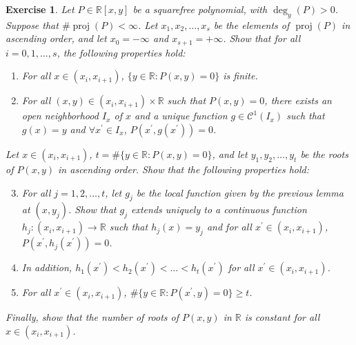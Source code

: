 \documentclass{article}
\newtheorem{exercise}{Exercise}
\begin{document}
\begin{exercise}
    Let $P \in \mathbb{R}[x,y]$ be a squarefree polynomial, with $\deg_{y}(P) > 0$. Suppose that $\#\operatorname{proj}(P)<\infty$. Let $x_{1},x_{2},\dots,x_{s}$ be the elements of $\operatorname{proj}(P)$ in ascending order, and let $x_{0} = -\infty$ and $x_{s+1} = +\infty$. Show that for all $i = 0, 1, \dots, s$, the following properties hold:
    \begin{enumerate}
        \item For all $x\in (x_{i},x_{i+1})$, $\lbrace y \in \mathbb{R} : P(x,y) = 0 \rbrace$ is finite.
        \item For all $(x,y)\in (x_{i},x_{i+1})\times \mathbb{R}$ such that $P(x,y) = 0$, there exists an open neighborhood \(I_{x}\) of \(x\) and a unique function \(g \in \mathcal{C}^{1}(I_{x})\) such that \(g(x) = y\) and \(\forall x^\prime \in I_{x}\), \(P(x^\prime,g(x^\prime))=0\).
    \end{enumerate}

    Let $x\in(x_{i},x_{i+1})$, $t=\#\lbrace y \in \mathbb{R} : P(x,y) = 0 \rbrace$, and let $y_{1},y_{2},\dots,y_{t}$ be the roots of $P(x,y)$ in ascending order. Show that the following properties hold:
    \begin{enumerate}
        \setcounter{enumi}{2}
        \item For all $j=1,2,\dots,t$, let $g_j$ be the local function given by the previous lemma at $(x,y_{j})$. Show that $g_j$ extends uniquely to a continuous function \(h_{j}: (x_{i},x_{i+1}) \to \mathbb{R}\) such that \(h_{j}(x) = y_{j}\) and for all \(x^\prime \in (x_{i},x_{i+1})\), \(P(x^\prime,h_{j}(x^\prime))=0\).
        \item In addition, $h_{1}(x^\prime) < h_{2}(x^\prime) < \dots < h_{t}(x^\prime)$ for all $x^\prime\in (x_{i},x_{i+1})$.
        \item For all $x^\prime\in (x_{i},x_{i+1})$, $\#\lbrace y \in \mathbb{R} : P(x^\prime,y) = 0 \rbrace \geq t$.
    \end{enumerate}

    Finally, show that the number of roots of $P(x,y)$ in $\mathbb{R}$ is constant for all $x\in (x_{i},x_{i+1})$.
\end{exercise}
\end{document}
